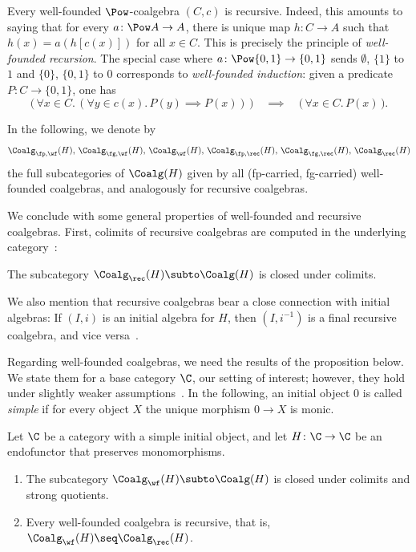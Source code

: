 \documentclass[a4paper,UKenglish, autoref, numberwithinsect, final]{lipics-v2021}
\numberwithin{equation}{section}
\theoremstyle{plain}
\theoremstyle{definition}
\begin{document}
\begin{example}[Graphs]
Every well-founded $\Pow$-coalgebra $(C,c)$ is recursive. Indeed, this amounts to saying that for every $a\colon \Pow A \to A$, there is unique map $h\colon C\to A$ such that $h(x)=a(h[c(x)])$ for all $x\in C$. This is precisely the principle of \emph{well-founded recursion}. The special case where $a\colon \Pow\{0,1\}\to \{0,1\}$ sends $\emptyset$, $\{1\}$ to $1$ and $\{0\}$, $\{0,1\}$ to $0$ corresponds to \emph{well-founded induction}: given a predicate $P\colon C\to \{0,1\}$, one has
\[ \big(\,\forall x\in C.\, (\forall y\in c(x).\, P(y) \implies P(x))\,\big) \quad\implies\quad \big(\,\forall x\in C.\, P(x)\,\big). \] 
\end{example}
\noindent
In the following, we denote by
\[\Coalg_{\fp,\wf}(H),\, \Coalg_{\fg,\wf}(H),\, \Coalg_\wf(H),\, \Coalg_{\fp,\rec}(H),\, \Coalg_{\fg,\rec}(H),\, \Coalg_\rec(H) \] 
the full subcategories of $\Coalg(H)$ given by all (fp-carried, fg-carried)  well-founded coalgebras, and analogously for recursive coalgebras. 

We conclude with some general properties of well-founded and recursive coalgebras. First, colimits of recursive coalgebras are computed in the underlying category~\cite[Prop.~7.1.9]{amm25}:
\begin{lemma}\label{lem:rec-coalg-colimits}
The subcategory $\Coalg_\rec(H)\subto \Coalg(H)$ is closed under colimits.
\end{lemma}
We also mention that recursive coalgebras bear a close connection with initial algebras: If $(I,i)$ is an initial algebra for $H$, then $(I,i^{-1})$ is a final recursive coalgebra, and vice versa~\cite{cuv06}.

Regarding well-founded coalgebras, we need the results of the proposition below. We state them for a \lfp base category $\C$, our setting of interest; however, they hold under slightly weaker assumptions~\cite[Cor.~8.4.3, Thm.~8.5.3]{amm25}. In the following, an initial object $0$ is called \emph{simple} if for every object $X$ the unique morphism $0\to X$ is monic.


\begin{proposition}\label{prop:wf} 
Let $\C$ be a \lfp category with a simple initial object, and let $H\colon \C\to \C$ be an endofunctor that preserves monomorphisms.
\begin{enumerate}
\item\label{prop:wf:closed-colim-quotients} The subcategory $\Coalg_\wf(H)\subto \Coalg(H)$ is closed under colimits and strong quotients.
\item\label{prop:wf:wf-to-rec} Every well-founded coalgebra is recursive, that is, $\Coalg_\wf(H)\seq \Coalg_\rec(H)$.
\end{enumerate}
\end{proposition}
\end{document}
